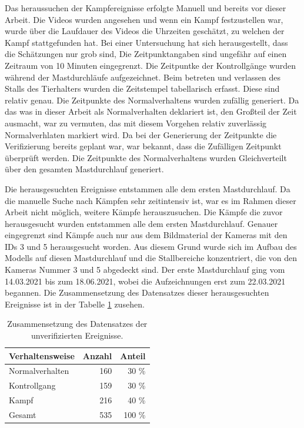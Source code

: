 Das heraussuchen der Kampfereignisse erfolgte Manuell und bereits vor dieser Arbeit. Die Videos wurden angesehen und wenn ein Kampf festzustellen war, wurde über die Laufdauer des Videos die Uhrzeiten geschätzt, zu welchen der Kampf stattgefunden hat. Bei einer Untersuchung hat sich herausgestellt, dass die Schätzungen nur grob sind, Die Zeitpunktangaben sind ungefähr auf einen Zeitraum von 10 Minuten eingegrenzt. Die Zeitpuntke der Kontrollgänge wurden während der Mastdurchläufe aufgezeichnet. Beim betreten und verlassen des Stalls des Tierhalters wurden die Zeitstempel tabellarisch erfasst. Diese sind relativ genau. Die Zeitpunkte des Normalverhaltens wurden zufällig generiert. Da das was in dieser Arbeit als Normalverhalten deklariert ist, den Großteil der Zeit ausmacht, war zu vermuten, das mit diesem Vorgehen relativ zuverlässig Normalverhlaten markiert wird. Da bei der Generierung der Zeitpunkte die Verifizierung bereits geplant war, war bekannt, dass die Zufälligen Zeitpunkt überprüft werden. Die Zeitpunkte des Normalverhaltens wurden Gleichverteilt über den gesamten Mastdurchlauf generiert.\par

Die herausgesuchten Ereignisse entstammen alle dem ersten Mastdurchlauf. Da die manuelle Suche nach Kämpfen sehr zeitintensiv ist, war es im Rahmen dieser Arbeit nicht möglich, weitere Kämpfe herauszusuchen. Die Kämpfe die zuvor herausgesucht wurden entstammen alle dem ersten Mastdurchlauf. Genauer eingegrenzt sind Kämpfe auch nur aus dem Bildmaterial der Kameras mit den IDs 3 und 5 herausgesucht worden. Aus diesem Grund wurde sich im Aufbau des Modells auf diesen Mastdurchlauf und die Stallbereiche konzentriert, die von den Kameras Nummer 3 und 5 abgedeckt sind. Der erste Mastdurchlauf ging vom 14.03.2021 bis zum 18.06.2021, wobei die Aufzeichnungen erst zum 22.03.2021 begannen.  Die Zusammensetzung des Datensatzes dieser herausgesuchten Ereignisse ist in der Tabelle \ref{tab:DataSetUnVeri} zusehen.\par


\begin{table}[ht]
    \centering
    \caption{Zusammensetzung des Datensatzes der unverifizierten Ereignisse.}
    \begin{tabular}{|l|r|r|}
    \hline
        Verhaltensweise & Anzahl & Anteil \\
    \hline
        Normalverhalten & 160 & 30 \%\\
        Kontrollgang & 159 & 30 \%\\
        Kampf & 216 & 40 \%\\
    \hline
    \hline
        Gesamt & 535 & 100 \%\\
    \hline
    \end{tabular}
    \label{tab:DataSetUnVeri}
\end{table}


